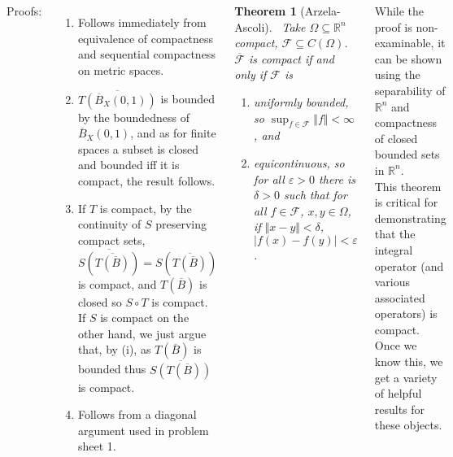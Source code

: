 \documentclass{tikzposter} %
\newtheorem{theorem}{Theorem}
\begin{document}
\begin{columns}
{    Proofs:
    \begin{enumerate}[label=\roman*.]
            \item Follows immediately from equivalence of compactness and sequential compactness on metric spaces.
            \item $\overline{T(\overline{B}_{X}(0,1))}$ is bounded by the boundedness of $\overline{B}_{X}(0,1)$, and as for finite spaces a subset is closed and bounded iff it is compact, the result follows.
            \item If $T$ is compact, by the continuity of $S$ preserving compact sets, $\overline{S(\overline{T(\overline{B})})} = S(\overline{T(\overline{B})})$ is compact, and $T(\overline{B})$ is closed so $S \circ T$ is compact. If $S$ is compact on the other hand, we just argue that, by (i), as $T(\overline{B})$ is bounded thus $\overline{S(T(\overline{B}))}$ is compact.
            \item Follows from a diagonal argument used in problem sheet 1.
    \end{enumerate}
    \hphantom{}

    \begin{theorem}[Arzela-Ascoli]
      \ Take $\Omega \subseteq \mathbb{R}^{n}$ compact, $\mathcal{F} \subseteq C(\Omega)$. $\overline{\mathcal{F}}$ is compact if and only if $\mathcal{F}$ is
      \begin{enumerate}[label=\roman*.]
        \item uniformly bounded, so $\displaystyle \sup_{f \in \mathcal{F}} \Vert f \Vert < \infty$, and
        \item equicontinuous, so for all $\varepsilon > 0$ there is $\delta > 0$ such that for all $f \in \mathcal{F}$, $x, y \in \Omega$, if $\Vert x - y \Vert < \delta$, $| f(x) - f(y) | < \varepsilon$.
      \end{enumerate}

    \end{theorem}
    \hphantom{}

    While the proof is non-examinable, it can be shown using the separability of $\mathbb{R}^{n}$ and compactness of closed bounded sets in $\mathbb{R}^{n}$. \\

    This theorem is critical for demonstrating that the integral operator (and various associated operators) is compact. Once we know this, we get a variety of helpful results for these objects.\\

}
\end{columns}
\end{document}
